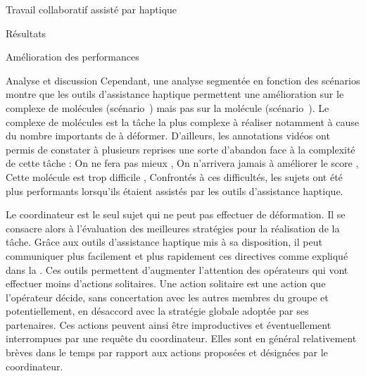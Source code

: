 \documentclass[myfrancais,ngerman,english,french]{mythesis}
\begin{document}
\begin{mychapter}{Travail collaboratif assisté par haptique}
\begin{mysection}{Résultats}
\begin{mysubsection}{Amélioration des performances}
\begin{mysubsubsection}{Analyse et discussion}
					Cependant, une analyse segmentée en fonction des scénarios montre que les outils d'assistance haptique permettent une amélioration sur le complexe de molécules \myNusENusG (scénario~) mais pas sur la molécule \myUbiquitin (scénario~).
					Le complexe de molécules \myNusENusG est la tâche la plus complexe à réaliser notamment à cause du nombre importants de  à déformer.
					D'ailleurs, les annotations vidéos ont permis de constater à plusieurs reprises une sorte d'abandon face à la complexité de cette tâche : \og On ne fera pas mieux \fg, \og On n'arrivera jamais à améliorer le score \fg, \og Cette molécule est trop difficile \fg, \myetc
					Confrontés à ces difficultés, les sujets ont été plus performants lorsqu'ils étaient assistés par les outils d'assistance haptique.

					Le coordinateur est le seul sujet qui ne peut pas effectuer de déformation.
					Il se consacre alors à l'évaluation des meilleures stratégies pour la réalisation de la tâche.
					Grâce aux outils d'assistance haptique mis à sa disposition, il peut communiquer plus facilement et plus rapidement ces directives comme expliqué dans la .
					Ces outils permettent d'augmenter l'attention des opérateurs qui vont effectuer moins d'actions solitaires.
					Une action solitaire est une action que l'opérateur décide, sans concertation avec les autres membres du groupe et potentiellement, en désaccord avec la stratégie globale adoptée par ses partenaires.
					Ces actions peuvent ainsi être improductives et éventuellement interrompues par une requête du coordinateur.
					Elles sont en général relativement brèves dans le temps par rapport aux actions proposées et désignées par le coordinateur.


\end{mysubsubsection}
\end{mysubsection}
\end{mysection}
\end{mychapter}
\end{document}
